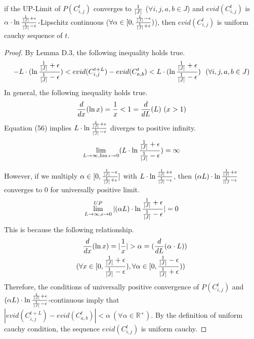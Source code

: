 \begin{lemma}
\label{lem:uniform_cauchy}
if the UP-Limit of $P(C^t_{i,j})$ converges to ${1 \over |J|}$ ($\forall i,j,a,b \in J$) 
and $evid(C^t_{i,j})$ is $\alpha\cdot\ln{{1\over|J|}+\epsilon \over {1\over|J|}-\epsilon}$-Lipschitz continuous 
($\forall \alpha \in [0,{{1 \over |J|}-\epsilon \over {1 \over |J|}+\epsilon})$),
then $evid(C^t_{i,j})$ is uniform cauchy sequence of $t$.
\end{lemma}
\begin{proof}
By Lemma D.3, the following inequality holds true. 
\begin{align}
    -L\cdot(\ln{{1 \over |J|}+\epsilon \over {1 \over |J|}-\epsilon})
    < evid(C^{t+L}_{i,j})-evid(C^{t}_{a,b})
    <L\cdot(\ln{{1 \over |J|}+\epsilon \over {1 \over |J|}-\epsilon})\ \ (\forall i, j, a, b \in J)
\end{align}
In general, the following inequality holds true. 
\begin{align}
    {d \over dx}(\ln x)={1 \over x} < 1 = {d \over dL}(L)\ (x > 1)
\end{align}
Equation (56) implies $L\cdot \ln{{1 \over |J|}+\epsilon \over {1 \over |J|}-\epsilon}$ diverges to positive infinity.
\begin{align}
    \lim_{L\rightarrow \infty, \lim \epsilon \rightarrow 0} (L\cdot\ln{{1 \over |J|}+\epsilon \over {1 \over |J|}-\epsilon})=\infty 
\end{align}

However, if we multiply $\alpha \in [0, {{1 \over |J|}-\epsilon \over {1 \over |J|}+\epsilon}]$ 
with $L\cdot \ln{{1 \over |J|}+\epsilon \over {1 \over |J|}-\epsilon}$, 
then $(\alpha L)\cdot \ln{{1\over|J|}+\epsilon \over {1 \over ||J}-\epsilon}$ converges to 0 for universally positive limit. 
\begin{align}
    \lim^{UP}_{L \rightarrow \infty, \epsilon \rightarrow 0}|(\alpha L)
    \cdot \ln{{1 \over |J|} + \epsilon \over {1 \over |J|} - \epsilon}| = 0 
\end{align}
This is because the following relationship.
\begin{align}
    \begin{split}
       &{d \over d x}(\ln x) = |{1 \over x}| > \alpha = ({d \over dL}(\alpha \cdot L)) \\
        (\forall &x \in [0, {{1 \over |J|} +\epsilon \over {1 \over |J|}-\epsilon}),
        \forall \alpha \in [0, {{1 \over |J|}-\epsilon \over {1 \over |J|}+\epsilon}))
    \end{split}
\end{align}
Therefore, the conditions of universally positive convergence of $P(C^t_{i,j})$ and
$(\alpha L)\cdot \ln{{1 \over |J|}+\epsilon \over {1 \over |J|}-\epsilon}$-continuous imply that 
$|evid(C^{t+L}_{i,j})-evid(C^t_{a,b})| < \alpha\ (\forall \alpha \in \mathbb{R}^+)$.
By the definition of uniform cauchy condition, the sequence $evid(C^t_{i,j})$ is uniform cauchy. 

\end{proof}

